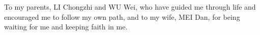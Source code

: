 \thispagestyle{empty}
\begin{dedication}
To my parents, LI Chongzhi and WU Wei, who have guided me through life and encouraged me
to follow my own path, and to my wife, MEI Dan, for being waiting for me and keeping faith in me.
\end{dedication}
\thispagestyle{empty} \cleardoublepage 
